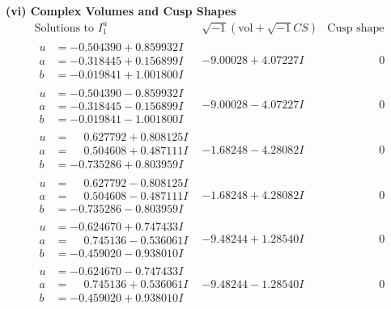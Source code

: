\documentclass[1p]{elsarticle_modified}
\theoremstyle{definition}
\newcommand{\I}{\sqrt{-1}}
\begin{document}
\newpage\flushleft \textbf{(vi) Complex Volumes and Cusp Shapes}
$$\begin{array}{c|c|c}  
\text{Solutions to }I^u_{1}& \I (\text{vol} + \sqrt{-1}CS) & \text{Cusp shape}\\
 \hline 
\begin{aligned}
u &= -0.504390 + 0.859932 I \\
a &= -0.318445 + 0.156899 I \\
b &= -0.019841 + 1.001800 I\end{aligned}
 & -9.00028 + 4.07227 I & \phantom{-0.000000 } 0 \\ \hline\begin{aligned}
u &= -0.504390 - 0.859932 I \\
a &= -0.318445 - 0.156899 I \\
b &= -0.019841 - 1.001800 I\end{aligned}
 & -9.00028 - 4.07227 I & \phantom{-0.000000 } 0 \\ \hline\begin{aligned}
u &= \phantom{-}0.627792 + 0.808125 I \\
a &= \phantom{-}0.504608 + 0.487111 I \\
b &= -0.735286 + 0.803959 I\end{aligned}
 & -1.68248 - 4.28082 I & \phantom{-0.000000 } 0 \\ \hline\begin{aligned}
u &= \phantom{-}0.627792 - 0.808125 I \\
a &= \phantom{-}0.504608 - 0.487111 I \\
b &= -0.735286 - 0.803959 I\end{aligned}
 & -1.68248 + 4.28082 I & \phantom{-0.000000 } 0 \\ \hline\begin{aligned}
u &= -0.624670 + 0.747433 I \\
a &= \phantom{-}0.745136 - 0.536061 I \\
b &= -0.459020 - 0.938010 I\end{aligned}
 & -9.48244 + 1.28540 I & \phantom{-0.000000 } 0 \\ \hline\begin{aligned}
u &= -0.624670 - 0.747433 I \\
a &= \phantom{-}0.745136 + 0.536061 I \\
b &= -0.459020 + 0.938010 I\end{aligned}
 & -9.48244 - 1.28540 I & \phantom{-0.000000 } 0 \\ \hline\begin{aligned}

\end{aligned}
\end{array}$$
\end{document}
